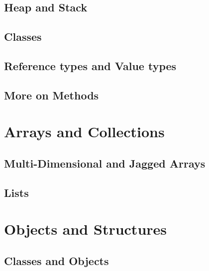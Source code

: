 \documentclass[
]{book}
\begin{document}
\hypertarget{heap-and-stack}{%
\section{Heap and Stack}\label{heap-and-stack}}

\hypertarget{classes}{%
\section{Classes}\label{classes}}

\hypertarget{reference-types-and-value-types}{%
\section{Reference types and Value types}\label{reference-types-and-value-types}}

\hypertarget{more-on-methods}{%
\section{More on Methods}\label{more-on-methods}}

\hypertarget{arrays-and-collections}{%
\chapter{Arrays and Collections}\label{arrays-and-collections}}

\hypertarget{multi-dimensional-and-jagged-arrays}{%
\section{Multi-Dimensional and Jagged Arrays}\label{multi-dimensional-and-jagged-arrays}}

\hypertarget{lists}{%
\section{Lists}\label{lists}}

\hypertarget{objects-and-structures}{%
\chapter{Objects and Structures}\label{objects-and-structures}}

\hypertarget{classes-and-objects}{%
\section{Classes and Objects}\label{classes-and-objects}}
\end{document}
